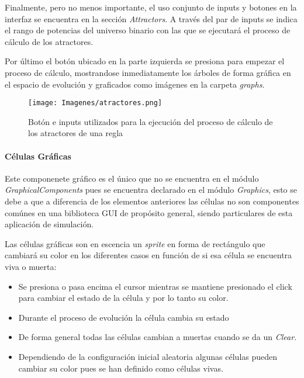 \documentclass[]{article}
\begin{document}
				\hfill\break
				\justifying
				Finalmente, pero no menos importante, el uso conjunto de inputs y botones en la interfaz se encuentra en la sección \textit{Attractors}. A través del par de inputs se indica el rango de potencias del universo binario con las que se ejecutará el proceso de cálculo de los atractores.
				
				\hfill\break
				\justifying
				Por último el botón ubicado en la parte izquierda se presiona para empezar el proceso de cálculo, mostrandose inmediatamente los árboles de forma gráfica en el espacio de evolución y graficados como imágenes en la carpeta \textit{graphs}.
				
				\begin{figure}[!h]
					\centering
					\texttt{[image: Imagenes/atractores.png]}
					\caption{Botón e inputs utilizados para la ejecución del proceso de cálculo de los atractores de una regla}
					\label{Attractors}
				\end{figure}
				
				
				
				\paragraph{Células Gráficas}
				\justifying
				Este componenete gráfico es el único que no se encuentra en el módulo \textit{GraphicalComponents} pues se encuentra declarado en el módulo \textit{Graphics}, esto se debe a que a diferencia de los elementos anteriores las células no son componentes comúnes en una biblioteca GUI de propósito general, siendo particulares de esta aplicación de simulación.
				
				\hfill\break
				\justifying
				Las células gráficas son en escencia un \textit{sprite} en forma de rectángulo que cambiará su color en los diferentes casos en función de si esa célula se encuentra viva o muerta:
				\begin{itemize}
					\item Se presiona o pasa encima el cursor mientras se mantiene presionado el click para cambiar el estado de la célula y por lo tanto su color.
					\item Durante el proceso de evolución la célula cambia su estado
					\item De forma general todas las células cambian a muertas cuando se da un \textit{Clear}.
					\item Dependiendo de la configuración inicial aleatoria algunas células pueden cambiar su color pues se han definido como células vivas.
				\end{itemize}
				
\end{document}
